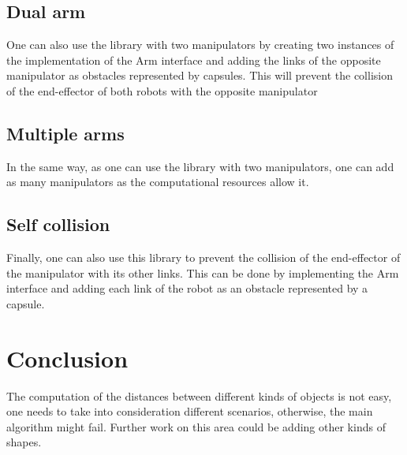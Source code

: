 \documentclass[a4paper, 10pt, conference]{ieeeconf}      %
\begin{document}
\subsection{Dual arm} %
One can also use the library with two manipulators by creating two instances of the implementation of the Arm interface and adding the links of 
the opposite manipulator as obstacles represented by capsules.
This will prevent the collision of the end-effector of both robots with the opposite manipulator
\subsection{Multiple arms}
In the same way, as one can use the library with two manipulators, one can add as many manipulators as the computational resources allow it.
\subsection{Self collision} %
Finally, one can also use this library to prevent the collision of the end-effector of the manipulator with its other links.
This can be done by implementing the Arm interface and adding each link of the robot as an obstacle represented by a capsule.

\section{Conclusion} %
The computation of the distances between different kinds of objects is not easy, one needs to take into consideration different scenarios, 
otherwise, the main algorithm might fail. Further work on this area could be adding other kinds of shapes.


\addtolength{\textheight}{-12cm}   %




\end{document}
